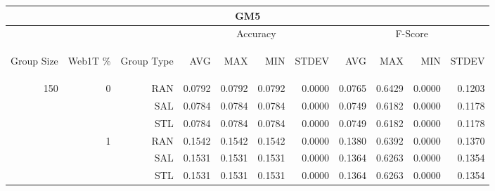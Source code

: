 \begin{center}
\begin{table}[htbp] 
 \begin{center}
\begin{tabular}{ | r | r | r | r | r | r | r | r | r | r | r |}
\hline
\multicolumn{11}{|c|}{GM5}\\
\hline
 & & & \multicolumn{4}{|c|}{Accuracy} & \multicolumn{4}{|c|}{F-Score}\\ \cline{4-11}
\begin{sideways}Group Size\end{sideways} & \begin{sideways}Web1T \%\end{sideways} & \begin{sideways}Group Type\end{sideways} & \begin{sideways}AVG\end{sideways} & \begin{sideways}MAX\end{sideways} & \begin{sideways}MIN\end{sideways} & \begin{sideways}STDEV\end{sideways} & \begin{sideways}AVG\end{sideways} & \begin{sideways}MAX\end{sideways} & \begin{sideways}MIN\end{sideways} & \begin{sideways}STDEV\end{sideways}\\
\hline
\multirow{18}{*}{150}
 & \multirow{3}{*}{0} & RAN & 0.0792 & 0.0792 & 0.0792 & 0.0000 & 0.0765 & 0.6429 & 0.0000 & 0.1203\\ \cline{3-11}
 &   & SAL & 0.0784 & 0.0784 & 0.0784 & 0.0000 & 0.0749 & 0.6182 & 0.0000 & 0.1178\\ \cline{3-11}
 &   & STL & 0.0784 & 0.0784 & 0.0784 & 0.0000 & 0.0749 & 0.6182 & 0.0000 & 0.1178\\ \cline{2-11}
 & \multirow{3}{*}{1} & RAN & 0.1542 & 0.1542 & 0.1542 & 0.0000 & 0.1380 & 0.6392 & 0.0000 & 0.1370\\ \cline{3-11}
 &   & SAL & 0.1531 & 0.1531 & 0.1531 & 0.0000 & 0.1364 & 0.6263 & 0.0000 & 0.1354\\ \cline{3-11}
 &   & STL & 0.1531 & 0.1531 & 0.1531 & 0.0000 & 0.1364 & 0.6263 & 0.0000 & 0.1354\\ \cline{2-11}

\end{tabular}
\end{center}
\end{table}
\end{center}

